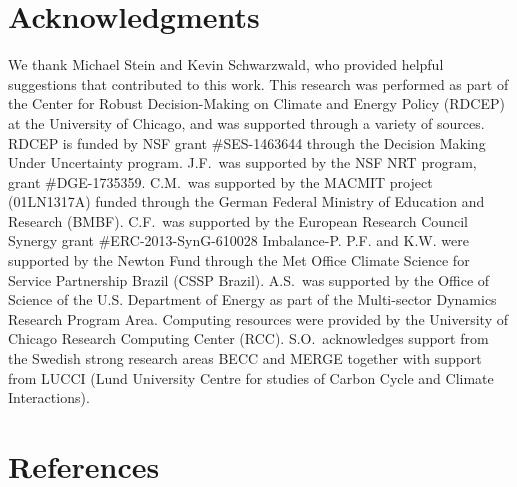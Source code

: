 \documentclass[preprint, 5p, times, twocolumn]{elsarticle}
\begin{document}
\section{Acknowledgments}
\label{S:5}
We thank Michael Stein and Kevin Schwarzwald, who provided helpful suggestions that contributed to this work. This research was performed as part of the Center for Robust Decision-Making on Climate and Energy Policy (RDCEP) at the University of Chicago, and was supported through a variety of sources. RDCEP is funded by NSF grant \#SES-1463644 through the Decision Making Under Uncertainty program. J.F.\ was supported by the NSF NRT program, grant \#DGE-1735359. C.M.\ was supported by the MACMIT project (01LN1317A) funded through the German Federal Ministry of Education and Research (BMBF).  C.F.\ was supported by the European Research Council Synergy grant \#ERC-2013-SynG-610028 Imbalance-P. P.F. and K.W. were supported  by the Newton Fund through the Met Office Climate Science for Service Partnership Brazil (CSSP Brazil). A.S.\ was supported by the Office of Science of the U.S. Department of Energy as part of the Multi-sector Dynamics Research Program Area. Computing resources were provided by the University of Chicago Research Computing Center (RCC). S.O.\ acknowledges support from the Swedish strong research areas BECC and MERGE together with support from LUCCI (Lund University Centre for studies of Carbon Cycle and Climate Interactions).
\section{References}
\label{S:6}




\end{document}
